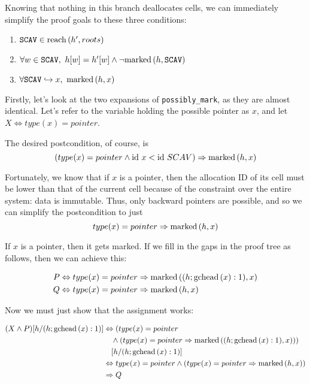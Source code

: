 \begin{lemma}
  Knowing that nothing in this branch deallocates cells, we can
  immediately simplify the proof goals to these three conditions:

  \begin{enumerate}
    \item $\mathtt{SCAV} \in \reach{h'}{roots}$
    \item $\forall w \in \mathtt{SCAV},\ h[w] = h'[w] \land
      \lnot\marked{h}{\mathtt{SCAV}}$
    \item $\forall \mathtt{SCAV} \pointsto x,\ \marked{h}{x}$
  \end{enumerate}

  Firstly, let's look at the two expansions of \texttt{possibly\_mark},
  as they are almost identical. Let's refer to the variable holding
  the possible pointer as $x$, and let $X \iff type(x) = pointer$.

  \begin{prooftree}

  \end{prooftree}

  The desired postcondition, of course, is \[(type(x) = pointer \land
  \id~x < \id~SCAV) \implies \marked{h}{x}\]

  Fortunately, we know that if $x$ is a pointer, then the allocation
  ID of its \gls{cell} must be lower than that of the current
  \gls{cell} because of the constraint over the entire system: data is
  immutable. Thus, only backward pointers are possible, and so we can
  simplify the postcondition to just \[type(x) = pointer \implies
  \marked{h}{x}\]

  If $x$ is a pointer, then it gets marked. If we fill in the gaps in
  the proof tree as follows, then we can achieve this:

  \begin{align*}
    P &\iff type(x) = pointer \implies \marked{(h; \gchead{x}:1)}{x}\\
    Q &\iff type(x) = pointer \implies \marked{h}{x}
  \end{align*}

  Now we must just show that the assignment works:

  \begin{align*}
    (X \land P)[h/(h; \gchead{x}:1)] &\iff (type(x) = pointer\\
    &\quad\land (type(x) = pointer \implies \marked{(h;
      \gchead{x}:1)}{x}))\\
    &\quad[h/(h; \gchead{x}:1)]\\
%
    &\iff type(x) = pointer \land (type(x) = pointer \implies
    \marked{h}{x})\\
%
    &\implies Q
  \end{align*}


\end{lemma}
